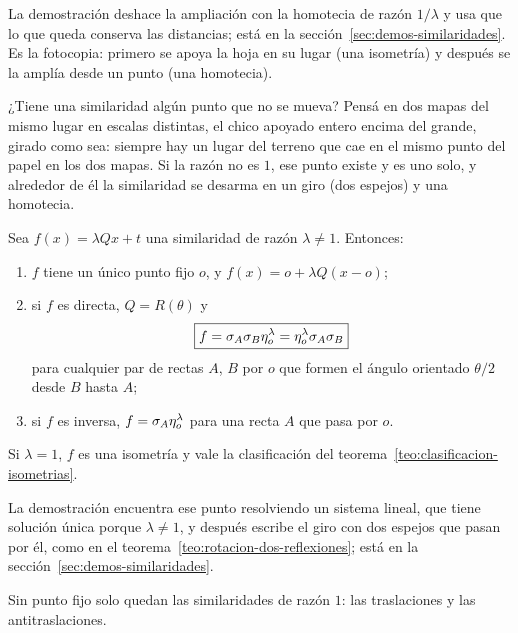 La demostración deshace la ampliación con la homotecia de razón \(1/\lambda\) y usa que lo que
queda conserva las distancias; está en la sección~\ref{sec:demos-similaridades}. Es la
fotocopia: primero se apoya la hoja en su lugar (una isometría) y después se la amplía desde un
punto (una homotecia).

¿Tiene una similaridad algún punto que no se mueva? Pensá en dos mapas del mismo lugar en
escalas distintas, el chico apoyado entero encima del grande, girado como sea: siempre hay un
lugar del terreno que cae en el mismo punto del papel en los dos mapas. Si la razón no es \(1\),
ese punto existe y es uno solo, y alrededor de él la similaridad se desarma en un giro (dos
espejos) y una homotecia.

\begin{teorema}\label{teo:similaridad-descomposicion}
Sea \(f(x)=\lambda Qx+t\) una similaridad de razón \(\lambda\neq1\). Entonces:
\begin{enumerate}
  \item \(f\) tiene un único punto fijo \(o\), y \(f(x)=o+\lambda Q(x-o)\);
  \item si \(f\) es directa, \(Q=R(\theta)\) y
  \[
    \boxed{f=\sigma_{A}\sigma_{B}\eta_{o}^{\lambda}=\eta_{o}^{\lambda}\sigma_{A}\sigma_{B}}
  \]
  para cualquier par de rectas \(A\), \(B\) por \(o\) que formen el ángulo orientado
  \(\theta/2\) desde \(B\) hasta \(A\);
  \item si \(f\) es inversa, \(f=\sigma_{A}\eta_{o}^{\lambda}\) para una recta \(A\) que pasa
  por \(o\).
\end{enumerate}
Si \(\lambda=1\), \(f\) es una isometría y vale la clasificación del
teorema~\ref{teo:clasificacion-isometrias}.
\end{teorema}

La demostración encuentra ese punto resolviendo un sistema lineal, que tiene solución única
porque \(\lambda\neq1\), y después escribe el giro con dos espejos que pasan por él, como en el
teorema~\ref{teo:rotacion-dos-reflexiones}; está en la sección~\ref{sec:demos-similaridades}.

Sin punto fijo solo quedan las similaridades de razón \(1\): las traslaciones y las
antitraslaciones.

